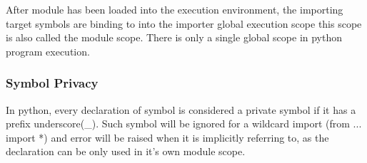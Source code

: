After module has been loaded into the execution environment, the importing target symbols are binding to into the importer global execution scope this scope is also called the module scope. There is only a single global scope in python program execution.

\subsubsection{Symbol Privacy}

In python, every declaration of symbol is considered a private symbol if it has a prefix underscore(\_). Such symbol will be ignored for a wildcard import (from ... import *) and error will be raised when it is implicitly referring to, as the declaration can be only used in it's own module scope.
